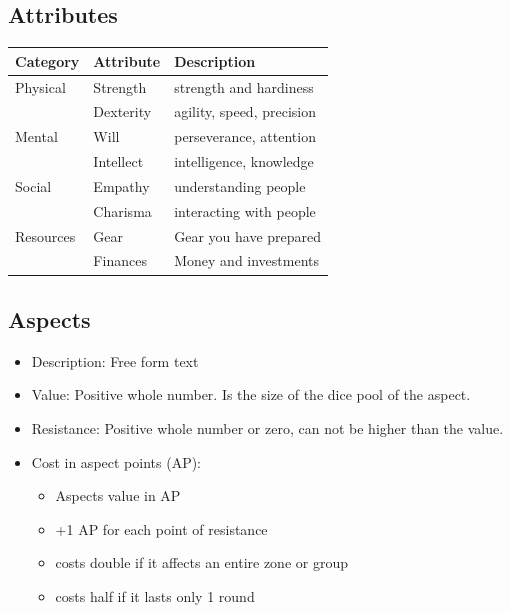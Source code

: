 \documentclass[11pt]{article}
\begin{document}
{\subsection{Attributes}
\label{sec:org51cba9f}
\begin{center}
\begin{tabular}{lll}
\textbf{Category} & \textbf{Attribute} & \textbf{Description}\\[0pt]
\hline
Physical & Strength & strength and hardiness\\[0pt]
 & Dexterity & agility, speed, precision\\[0pt]
\hline
Mental & Will & perseverance, attention\\[0pt]
 & Intellect & intelligence, knowledge\\[0pt]
\hline
Social & Empathy & understanding people\\[0pt]
 & Charisma & interacting with people\\[0pt]
\hline
Resources & Gear & Gear you have prepared\\[0pt]
 & Finances & Money and investments\\[0pt]
\end{tabular}
\end{center}

\subsection{Aspects}
\label{sec:org844121c}
\begin{itemize}
\item Description: Free form text
\item Value: Positive whole number. Is the size of the dice pool of the aspect.
\item Resistance: Positive whole number or zero, can not be higher than the value.
\item Cost in aspect points (AP):
\begin{itemize}
\item Aspects value in AP
\item +1 AP for each point of resistance
\item costs double if it affects an entire zone or group
\item costs half if it lasts only 1 round
\end{itemize}
\end{itemize}

}
\end{document}

